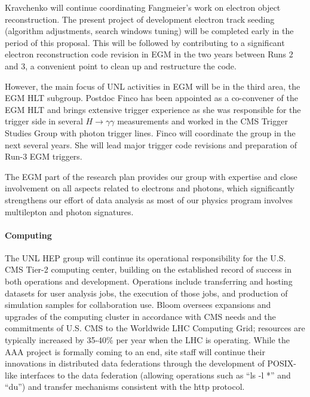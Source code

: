 Kravchenko will continue coordinating Fangmeier's work on electron object reconstruction. The present project of development electron track seeding (algorithm adjustments, search windows tuning) will be completed early in the period of this proposal. This will be followed by contributing to a significant electron reconstruction code revision in EGM in the two years between Runs 2 and 3, a convenient point to clean up and restructure the code.

However, the main focus of UNL activities in EGM will be in the third area, the EGM HLT subgroup. Postdoc Finco has been appointed as a co-convener of the EGM HLT and brings extensive trigger experience as she was responsible for the trigger side in several $H\to\gamma\gamma$ measurements and worked in the CMS Trigger Studies Group with photon trigger lines. Finco will coordinate the group in the next several years. She will lead major trigger code revisions and preparation of Run-3 EGM triggers.

The EGM part of the research plan provides our group with expertise and close involvement on all aspects related to electrons and photons, which significantly strengthens our effort of data analysis as most of our physics program involves multilepton and photon signatures.

\paragraph{Computing} The UNL HEP group will continue its operational responsibility for the U.S. CMS Tier-2 computing center, building on the established record of success in both operations and development. Operations include transferring and hosting datasets for user analysis jobs, the execution of those jobs, and production of simulation samples for collaboration use. Bloom oversees expansions and upgrades of the computing cluster in accordance with CMS needs and the commitments of U.S. CMS to the Worldwide LHC Computing Grid; resources are typically increased by 35-40\% per year when the LHC is operating.  While the AAA project is formally coming to an end, site staff will continue their innovations in distributed data federations through the development of POSIX-like interfaces to the data federation (allowing operations such as ``ls -l *'' and ``du'') and transfer mechanisms consistent with the http protocol.

